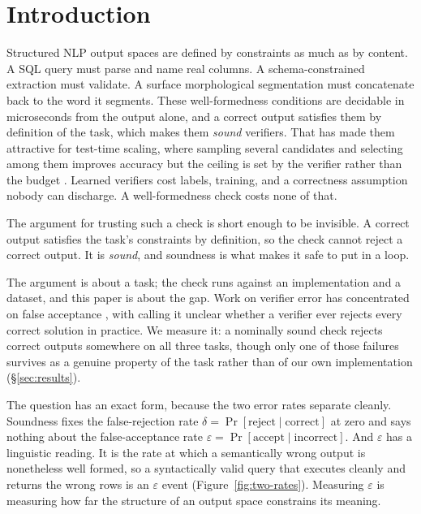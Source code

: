 \documentclass[11pt]{article}
\begin{document}
\section{Introduction}\label{sec:intro}
Structured NLP output spaces are defined by constraints as much as by content. A
SQL query must parse and name real columns. A schema-constrained extraction must
validate. A surface morphological segmentation must concatenate back to the word
it segments. These well-formedness conditions are decidable in microseconds from
the output alone, and a correct output satisfies them by definition of the task,
which makes them \emph{sound} verifiers. That has made them attractive for
test-time scaling, where sampling several candidates and selecting among them
improves accuracy \citep{snell2024scaling,brown2024monkeys,wang2023self} but the
ceiling is set by the verifier rather than the budget
\citep{stroebl2024verifier,dorner2025rocnreroll}. Learned verifiers
\citep{lightman2024verify} cost labels, training, and a correctness assumption
nobody can discharge. A well-formedness check costs none of that.

The argument for trusting such a check is short enough to be invisible. A
correct output satisfies the task's constraints by definition, so the check
cannot reject a correct output. It is \emph{sound}, and soundness is what makes
it safe to put in a loop.

The argument is about a task; the check runs against an implementation and a
dataset, and this paper is about the gap. Work on verifier error has
concentrated on false acceptance
\citep{stroebl2024verifier,dorner2025rocnreroll,variationverif2026}, with
\citet{stroebl2024verifier} calling it unclear whether a verifier ever rejects
every correct solution in practice. We measure it: a nominally sound check
rejects correct outputs somewhere on all three tasks, though only one of
those failures survives as a genuine property of the task rather than of
our own implementation (\S\ref{sec:results}).

The question has an exact form, because the two error rates separate cleanly.
Soundness fixes the false-rejection rate
$\delta=\Pr[\text{reject}\mid\text{correct}]$ at zero and says nothing about the
false-acceptance rate $\varepsilon=\Pr[\text{accept}\mid\text{incorrect}]$. And
$\varepsilon$ has a linguistic reading. It is the rate at which a semantically
wrong output is nonetheless well formed, so a syntactically valid query that
executes cleanly and returns the wrong rows is an $\varepsilon$ event
(Figure~\ref{fig:two-rates}). Measuring $\varepsilon$ is measuring how far the
structure of an output space constrains its meaning.
\end{document}
